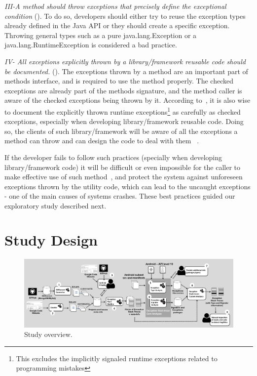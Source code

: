 \documentclass[conference]{IEEEtran}
\begin{document}

\emph{III-A method should throw exceptions that precisely define the
exceptional condition} (\cite{gosling2000java,bloch2008effective}). To do so,
developers should either try to reuse the exception types already defined in the
Java API or they should create a specific exception. Throwing general types such as a
pure java.lang.Exception or a java.lang.RuntimeException is considered a bad practice.


\emph{IV- All exceptions explicitly thrown by a library/framework reusable code should be documented.}
(\cite{mandrioli1992advances,gosling2000java,wirfs2006toward,bloch2008effective}).
The exceptions thrown by a method are an important part of methods interface,
and is required to use the method properly. The checked exceptions are already
part of the  methods signature, and the method caller is aware of the checked
exceptions being thrown by it. According to~\cite{bloch2008effective}, it is
also wise to document the explicitly thrown runtime exceptions\footnote{This
excludes the implicitly signaled runtime exceptions related to programming
mistakes} as carefully as checked exceptions, especially when developing
 library/framework reusable code. Doing so, the clients of such library/framework
will be aware of all the exceptions a method can throw and can design the code
to deal with them ~\cite{Robil00}. 

If the developer fails to follow such practices (specially when developing 
library/framework code) it will be difficult or even impossible for the caller to 
make effective use of such method~\cite{wirfs2006toward, bloch2008effective},
and protect the system against unforeseen exceptions thrown by the utility code,
which can lead to the uncaught exceptions - one of the main causes of 
systems crashes. These best practices guided our exploratory study described next.


\section{Study Design}
\label{sec:study}


\begin{figure} \centering \includegraphics[scale=0.3]{studyprocess2.png}
\caption{Study overview.} \label{fig:overview} \end{figure}
\end{document}
